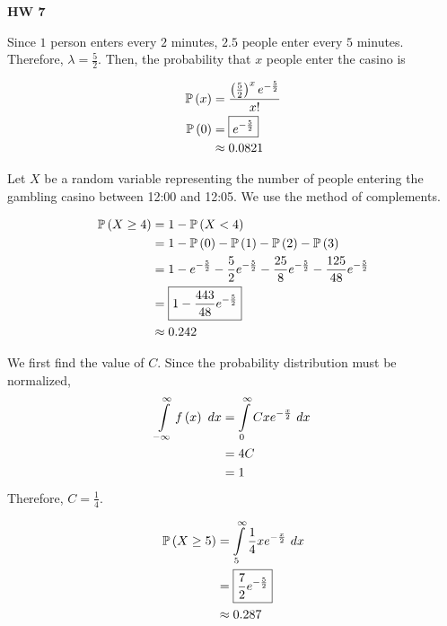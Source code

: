\documentclass{article}
\begin{document}
\begin{center}
  \Large \textbf{HW 7}
\end{center}

\setcounter{problem}{65}

\problem{}
\subproblema{}
Since $1$ person enters every $2$ minutes,
$2.5$ people enter every $5$ minutes.
Therefore,
$\lambda = \frac{5}{2}$.
Then, the probability that $x$ people enter the casino is

\begin{align*}
  \mathbb{P} \left ( x \right) &= \frac{\left (\frac{5}{2} \right)^x e^{- \frac{5}{2}}}{x!} \\
  \mathbb{P} \left ( 0 \right) &= \boxed{e^{-\frac{5}{2}}} \\
         & \approx 0.0821 \\
\end{align*}

\subproblema{}
Let $X$ be a random variable representing the number of people entering the gambling casino between 12:00 and 12:05.
We use the method of complements.

\begin{align*}
  \mathbb{P} \left ( X \geq 4 \right) &= 1 - \mathbb{P} \left ( X < 4 \right) \\
                &= 1 - \mathbb{P} \left ( 0 \right) - \mathbb{P} \left ( 1 \right) - \mathbb{P} \left ( 2 \right) - \mathbb{P} \left ( 3 \right) \\
                &= 1 - e^{-\frac{5}{2}} - \frac{5}{2} e^{-\frac{5}{2}} - \frac{25}{8} e^{-\frac{5}{2}} - \frac{125}{48} e^{-\frac{5}{2}} \\
                &= \boxed{1 - \frac{443}{48} e^{-\frac{5}{2}}} \\
                & \approx 0.242 \\
\end{align*}

\setcounter{problem}{1}

\problem{}
We first find the value of $C$.
Since the probability distribution must be normalized,
\begin{align*}
  \int \limits_{-\infty}^{\infty} f \left (x \right)\ dx &= \int \limits_{0}^{\infty} C x e^{- \frac{x}{2}}\ dx \\
                                                 &= 4 C \\
                                                 &= 1 \\
\end{align*}
Therefore, $C = \frac{1}{4}$.


\begin{align*}
  \mathbb{P} \left ( X \geq 5 \right) &= \int \limits_{5}^{\infty} \frac{1}{4} x e^{- \frac{x}{2}}\ dx \\
                &= \boxed{\frac{7}{2} e^{- \frac{5}{2}}} \\
                & \approx 0.287 \\
\end{align*}
\end{document}
